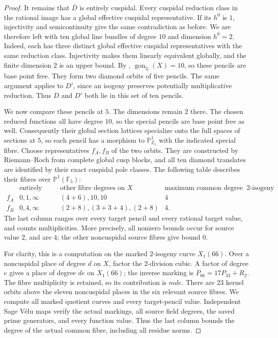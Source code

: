 \begin{proof}
It remains that $\overline D$ is entirely cuspidal. Every cuspidal
reduction class in the rational image has a global effective cuspidal
representative. If its $h^0$ is $1$, injectivity and semicontinuity
give the same contradiction as before. We are therefore left with
ten global line bundles of degree $10$ and dimension $h^0=2$.
Indeed, each has three distinct global effective cuspidal
representatives with the same reduction class. Injectivity makes
them linearly equivalent globally, and the finite dimension $2$
is an upper bound. By \cite[Table~1]{DvH},
$\operatorname{gon}_{\mathbb Q}(X)=10$, so these pencils are base point free.
They form two diamond orbits of five pencils.
The same argument applies to $D'$, since an isogeny preserves
potentially multiplicative reduction. Thus $D$ and $D'$ both lie in
this set of ten pencils.

We now compare these pencils at $5$. The dimensions remain $2$ there.
The chosen reduced functions all have degree $10$, so the special
pencils are base point free as well.
Consequently their global section lattices specialize onto the full
spaces of sections at $5$, so each pencil has a morphism to
$\mathbb P^1_{\mathbb Z_5}$ with the indicated special fibre.
Choose representatives $f_A,f_B$ of the two orbits.
They are constructed by Riemann--Roch from complete global cusp blocks,
and all ten diamond translates are identified by their exact
cuspidal pole classes. The following table describes their fibres
over $\mathbb P^1(\mathbb F_5)$:
\[
\begin{array}{c|c|c|c}
 &\text{entirely cuspidal fibres}&
 \text{other fibre degrees on }X&
 \text{maximum common degree after a marked }2\text{-isogeny}\\\hline
 f_A&0,1,\infty&(4+6),10,10&4\\
 f_B&0,4,\infty&(2+8),(3+3+4),(2+8)&4.
\end{array}
\]
The last column ranges over every target pencil and every rational
target value, and counts multiplicities. More precisely, all nonzero
bounds occur for source value $2$, and are $4$; the other noncuspidal
source fibres give bound $0$.

For clarity, this is a computation on the marked $2$-isogeny curve
$X_1(66)$. Over a noncuspidal place of degree $d$ on $X$, factor the
$2$-division cubic. A factor of degree $e$ gives a place of degree
$de$ on $X_1(66)$; the inverse marking is
$P_{66}=17P_{33}+R_2$. The fibre multiplicity is retained, so its
contribution is $mde$. There are $23$ kernel orbits above the eleven
noncuspidal places in the six relevant source fibres. We compute all
marked quotient curves and every target-pencil value. Independent
Sage V\'elu maps verify the actual markings, all source field degrees,
the saved prime generators, and every function value. Thus the last
column bounds the degree of the actual common fibre, including all
residue norms.


\end{proof}
